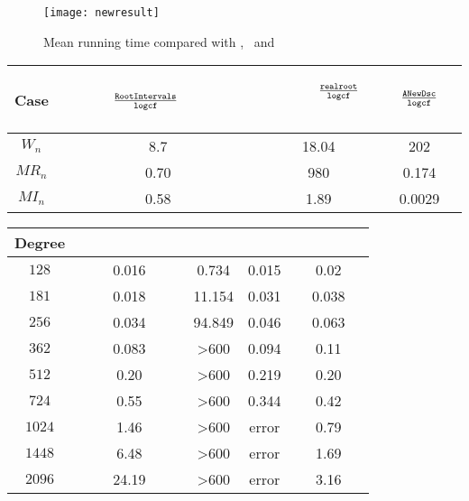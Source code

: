 \begin{figure}[!h]
	\begin{centering}
		\texttt{[image: newresult]}
		\caption{ Mean running time compared with \inte, \REALROOT\ and \AND\label{fig:newresult}}
	\end{centering}
\end{figure}

\begin{table}[!h]
	\centering
	\label{tab:other}
	\begin{tabular}{|| c| c| c| c||}
		\hline
		
		\hline
		\scriptsize{Case}  &\ \  \ \ \ \ \scriptsize{$\frac{{\tt RootIntervals} }{{\tt logcf}}$}\ \  \ \ \ \ \  \ \   & \ \ \ \ \  \scriptsize{$\frac{{\tt realroot}}{{\tt logcf}}$} \ \ \ \ \  &\ \ \ \  \scriptsize{ $\frac{{\tt ANewDsc}}{{\tt logcf}}$ }  \ \ \ \   \\
		\hline
		$W_n$ & 8.7 & 18.04 &  202 \\
		\hline
		$MR_n$ & 0.70 & 980 & 0.174\\
		\hline
		$MI_n$ & 0.58 & 1.89&  0.0029  \\
		\hline
		
		\hline
	\end{tabular}%
\end{table}

\begin{table}[!h]
	\centering
	\label{tab:and}
	\begin{tabular}{|| c| c| c| c| c ||}
		\hline
		
		\hline
		\scriptsize{Degree}  &\ \  \ \ \ \ \scriptsize{\froot}\ \  \ \  \ \   & \scriptsize{\REALROOT} &\scriptsize{\inte}  &\ \   \ \    \scriptsize{\AND}\ \ \ \   \\
		\hline
		$128$ & 0.016 & 0.734 &  0.015 &  0.02\\
		\hline
		$181$ & 0.018 & 11.154 & 0.031 & 0.038\\
		\hline
		$256$ & 0.034 & 94.849&  0.046  & 0.063\\
		\hline
		$362$ & 0.083 & >600&  0.094 & 0.11\\
		\hline
		$512$ & 0.20 &  >600 & 0.219 & 0.20  \\
		
		\hline
		$724$ & 0.55 &  >600&  0.344 & 0.42 \\
		
		\hline
		$1024$ & 1.46 & >600 & error & 0.79 \\
		
		\hline
		$1448$ & 6.48 &  >600&  error &  1.69 \\
		\hline
		$2096$ & 24.19 &  >600&  error & 3.16 \\	
		\hline
		
		\hline
	\end{tabular}%
\end{table}

